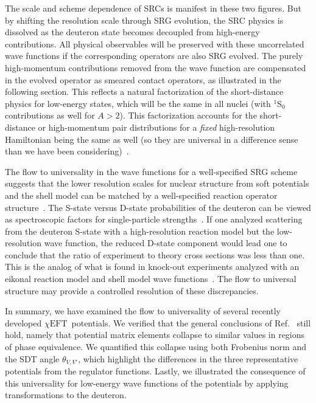 \documentclass[10pt,aps,prc,floatfix,twocolumn,nofootinbib]{revtex4-1}
\newcommand{\chiEFT}{\ensuremath{\chi{\textrm{EFT}}}}
\begin{document}
The scale and scheme dependence of SRCs is manifest in these two figures.
But by shifting the resolution scale through SRG evolution, the SRC physics is dissolved as the deuteron state becomes decoupled from high-energy contributions.
All physical observables will be preserved with these uncorrelated wave functions if the corresponding operators are also SRG evolved.
The purely high-momentum contributions removed from the wave function are compensated in the evolved operator as smeared contact operators, as illustrated in the following section.
This reflects a natural factorization of the short-distance physics for low-energy states, which will be the same in all nuclei (with $^1$S$_0$ contributions as well for $A>2$).
This factorization accounts for the short-distance or high-momentum pair distributions for a \emph{fixed} high-resolution Hamiltonian being the same as well (so they are universal in a difference sense than we have been considering)~\cite{Anderson:2010aq,Bogner:2012zm}.


The flow to universality in the wave functions for a well-specified SRG scheme suggests that the lower resolution scales for nuclear structure from soft potentials and the shell model can be matched by a well-specified reaction operator structure~\cite{More:2017syr}.  
The S-state versus D-state probabilities of the deuteron can be viewed as spectroscopic factors for single-particle strengths~\cite{Furnstahl:2010wd}.
If one analyzed scattering from the deuteron S-state with a high-resolution reaction model but the low-resolution wave function, the reduced D-state component would lead one to conclude that the ratio of experiment to theory cross sections was less than one.
This is the analog of what is found in knock-out experiments analyzed with an eikonal reaction model and shell model wave functions~\cite{Tostevin:2014usa}.
The flow to universal structure may provide a controlled resolution of these discrepancies.


In summary, we have examined the flow to universality of several recently developed \chiEFT\ potentials.
We verified that the general conclusions of Ref.~\cite{Dainton:2013axa} still hold, namely that potential matrix elements collapse to similar values in regions of phase equivalence. 
We quantified this collapse using both Frobenius norm and the SDT angle $\theta_{V,V'}$, which highlight the differences in the three representative potentials from the regulator functions.
Lastly, we illustrated the consequence of this universality for low-energy wave functions of the potentials by applying transformations to the deuteron.
\end{document}
